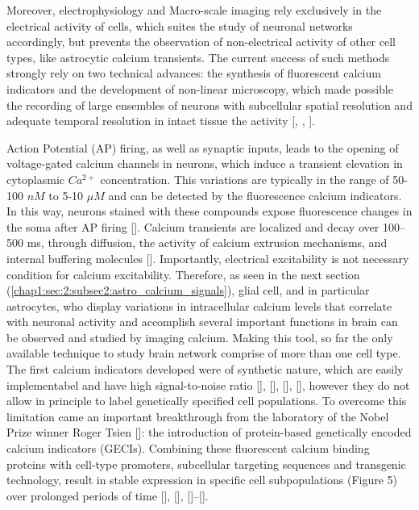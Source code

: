 Moreover, electrophysiology and Macro-scale imaging rely exclusively in the electrical activity of cells, which suites the study of neuronal networks accordingly, but prevents the observation of non-electrical activity of other cell types, like astrocytic calcium transients. 
The current success of such methods strongly rely on two technical advances: the synthesis of fluorescent calcium indicators and the development of non-linear microscopy, which made possible the recording of large ensembles of neurons with subcellular spatial resolution and adequate temporal resolution in intact tissue the activity [\cite{bovetti2014}, \cite{yang2017}, \cite{svoboda2006}].

Action Potential (AP) firing, as well as synaptic inputs, leads to the opening of voltage-gated calcium channels in neurons, which induce a transient elevation in cytoplasmic $Ca^{2+}$ concentration.
This variations are typically in the range of 50-100 $nM$ to 5-10 $\mu M$ and can be detected by the fluorescence calcium indicators.
In this way, neurons stained with these compounds expose fluorescence changes in the soma after AP firing [\cite{yuste1991}].
Calcium transients are localized and decay over 100–500 ms, through diffusion, the activity of calcium extrusion mechanisms, and internal buffering molecules [\cite{grienberger2012}].
Importantly, electrical excitability is not necessary condition for calcium excitability. Therefore, as seen in the next section (\ref{chap1:sec:2:subsec2:astro_calcium_signals}), glial cell, and in particular astrocytes, who display variations in intracellular calcium levels that correlate with neuronal activity and accomplish several important functions in brain can be observed and studied by imaging calcium. 
Making this tool, so far the only available technique to study brain network comprise of more than one cell type.  
The first calcium indicators developed were of synthetic nature, which are easily implementabel and have high signal-to-noise ratio [\cite{stosiek2003}], [\cite{grienberger2012}], [\cite{wiederschain2011}], [\cite{helmchen2002}], however they do not allow in principle to label genetically specified cell populations.
To overcome this limitation came an important breakthrough from the laboratory of the Nobel Prize winner Roger Tsien [\cite{miyawaki1997}]: the introduction of protein-based genetically encoded calcium indicators (GECIs). 
Combining these fluorescent calcium binding proteins with cell-type promoters, subcellular targeting sequences and transgenic technology, result in stable expression in specific cell subpopulations (Figure 5) over prolonged periods of time [\cite{grienberger2012}], [\cite{knopfel2006}], [\cite{looger2012}]–[\cite{chen2013}]. 
